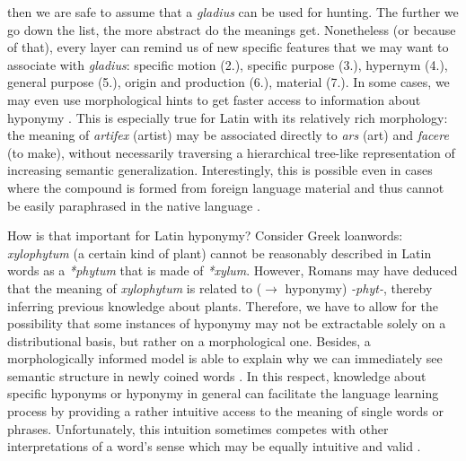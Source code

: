 \documentclass[runningheads]{llncs}
\begin{document}
then we are safe to assume that a \textit{gladius} can be used for hunting. The further we go down the list, the more abstract do the meanings get. Nonetheless (or because of that), every layer can remind us of new specific features that we may want to associate with \textit{gladius}: specific motion (2.), specific purpose (3.), hypernym (4.), general purpose (5.), origin and production (6.), material (7.). In some cases, we may even use morphological hints to get faster access to information about hyponymy \parencite[913]{anstattTypenSemantischerRelationen2009}. This is especially true for Latin with its relatively rich morphology: the meaning of \textit{artifex} (artist) may be associated directly to \textit{ars} (art) and \textit{facere} (to make), without necessarily traversing a hierarchical tree-like representation of increasing semantic generalization. Interestingly, this is possible even in cases where the compound is formed from foreign language material and thus cannot be easily paraphrased in the native language \parencite[33]{souille-rigautSemanticAccountQuasiLexemes2010}. 

How is that important for Latin hyponymy? Consider Greek loanwords: \textit{xylophytum} (a certain kind of plant) cannot be reasonably described in Latin words as a \textit{*phytum} that is made of \textit{*xylum}. However, Romans may have deduced that the meaning of \textit{xylophytum} is related to ($\rightarrow$ hyponymy) \textit{-phyt-}, thereby inferring previous knowledge about plants. Therefore, we have to allow for the possibility that some instances of hyponymy may not be extractable solely on a distributional basis, but rather on a morphological one. Besides, a morphologically informed model is able to explain why we can immediately see semantic structure in newly coined words \parencite[43]{souille-rigautSemanticAccountQuasiLexemes2010}. In this respect, knowledge about specific hyponyms or hyponymy in general can facilitate the language learning process by providing a rather intuitive access to the meaning of single words or phrases. Unfortunately, this intuition sometimes competes with other interpretations of a word's sense which may be equally intuitive and valid \parencite[126]{ponsborderiaPathsGrammaticalizationSpanish2014}. 
\end{document}
